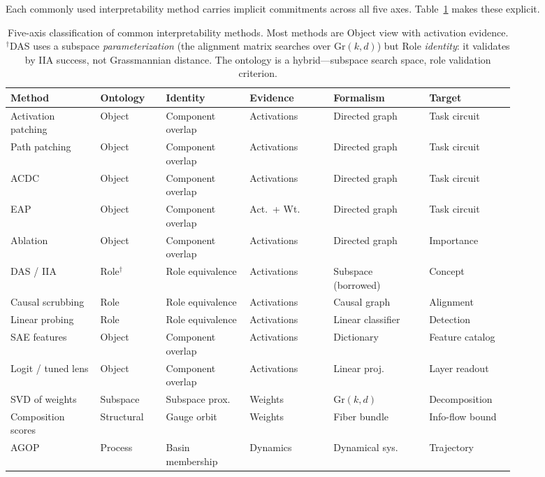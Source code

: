 \documentclass{article}
\newcommand{\Gr}{\mathrm{Gr}}
\begin{document}
Each commonly used interpretability method carries implicit commitments
across all five axes.  Table~\ref{tab:methods} makes these explicit.

\begin{table}[H]
\centering
\small
\setlength{\tabcolsep}{3.5pt}
\begin{tabular}{p{0.15\linewidth}p{0.11\linewidth}p{0.14\linewidth}p{0.14\linewidth}p{0.16\linewidth}p{0.14\linewidth}}
\toprule
\textbf{Method} & \textbf{Ontology} & \textbf{Identity} & \textbf{Evidence} & \textbf{Formalism} & \textbf{Target} \\
\midrule
Activation patching & Object & Component overlap & Activations & Directed graph & Task circuit \\[2pt]
Path patching       & Object & Component overlap & Activations & Directed graph & Task circuit \\[2pt]
ACDC                & Object & Component overlap & Activations & Directed graph & Task circuit \\[2pt]
EAP                 & Object & Component overlap & Act.\ + Wt. & Directed graph & Task circuit \\[2pt]
Ablation            & Object & Component overlap & Activations & Directed graph & Importance \\[2pt]
DAS / IIA           & Role$^\dagger$   & Role equivalence  & Activations & Subspace (borrowed) & Concept \\[2pt]
Causal scrubbing    & Role   & Role equivalence  & Activations & Causal graph & Alignment \\[2pt]
Linear probing      & Role   & Role equivalence  & Activations & Linear classifier & Detection \\[2pt]
SAE features        & Object & Component overlap & Activations & Dictionary & Feature catalog \\[2pt]
Logit / tuned lens  & Object & Component overlap & Activations & Linear proj. & Layer readout \\[2pt]
SVD of weights      & Subspace & Subspace prox. & Weights & $\Gr(k,d)$ & Decomposition \\[2pt]
Composition scores  & Structural & Gauge orbit  & Weights & Fiber bundle & Info-flow bound \\[2pt]
AGOP                & Process & Basin membership  & Dynamics & Dynamical sys. & Trajectory \\
\bottomrule
\end{tabular}
\caption{Five-axis classification of common interpretability methods.  Most
  methods are Object view with activation evidence.
  $^\dagger$DAS uses a subspace \emph{parameterization} (the alignment
  matrix searches over $\Gr(k,d)$) but Role \emph{identity}: it
  validates by IIA success, not Grassmannian distance.  The ontology is
  a hybrid---subspace search space, role validation criterion.}
\label{tab:methods}
\end{table}
\end{document}
